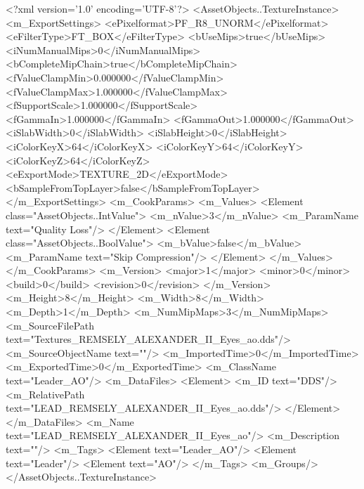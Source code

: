 <?xml version='1.0' encoding='UTF-8'?>
<AssetObjects..TextureInstance>
  <m_ExportSettings>
    <ePixelformat>PF_R8_UNORM</ePixelformat>
    <eFilterType>FT_BOX</eFilterType>
    <bUseMips>true</bUseMips>
    <iNumManualMips>0</iNumManualMips>
    <bCompleteMipChain>true</bCompleteMipChain>
    <fValueClampMin>0.000000</fValueClampMin>
    <fValueClampMax>1.000000</fValueClampMax>
    <fSupportScale>1.000000</fSupportScale>
    <fGammaIn>1.000000</fGammaIn>
    <fGammaOut>1.000000</fGammaOut>
    <iSlabWidth>0</iSlabWidth>
    <iSlabHeight>0</iSlabHeight>
    <iColorKeyX>64</iColorKeyX>
    <iColorKeyY>64</iColorKeyY>
    <iColorKeyZ>64</iColorKeyZ>
    <eExportMode>TEXTURE_2D</eExportMode>
    <bSampleFromTopLayer>false</bSampleFromTopLayer>
  </m_ExportSettings>
  <m_CookParams>
    <m_Values>
      <Element class="AssetObjects..IntValue">
        <m_nValue>3</m_nValue>
        <m_ParamName text="Quality Loss"/>
      </Element>
      <Element class="AssetObjects..BoolValue">
        <m_bValue>false</m_bValue>
        <m_ParamName text="Skip Compression"/>
      </Element>
    </m_Values>
  </m_CookParams>
  <m_Version>
    <major>1</major>
    <minor>0</minor>
    <build>0</build>
    <revision>0</revision>
  </m_Version>
  <m_Height>8</m_Height>
  <m_Width>8</m_Width>
  <m_Depth>1</m_Depth>
  <m_NumMipMaps>3</m_NumMipMaps>
  <m_SourceFilePath text="Textures\LEAD_REMSELY_ALEXANDER_II_Eyes_ao.dds"/>
  <m_SourceObjectName text=""/>
  <m_ImportedTime>0</m_ImportedTime>
  <m_ExportedTime>0</m_ExportedTime>
  <m_ClassName text="Leader_AO"/>
  <m_DataFiles>
    <Element>
      <m_ID text="DDS"/>
      <m_RelativePath text="LEAD_REMSELY_ALEXANDER_II_Eyes_ao.dds"/>
    </Element>
  </m_DataFiles>
  <m_Name text="LEAD_REMSELY_ALEXANDER_II_Eyes_ao"/>
  <m_Description text=""/>
  <m_Tags>
    <Element text="Leader_AO"/>
    <Element text="Leader"/>
    <Element text="AO"/>
  </m_Tags>
  <m_Groups/>
</AssetObjects..TextureInstance>
